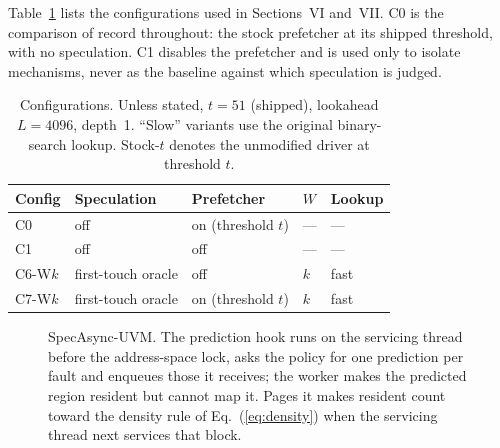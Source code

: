 Table~\ref{tab:configs} lists the configurations used in Sections~VI
and~VII. C0 is the comparison of record throughout: the stock prefetcher at
its shipped threshold, with no speculation. C1 disables the prefetcher and is
used only to isolate mechanisms, never as the baseline against which
speculation is judged.

\begin{table}[t]
\centering
\footnotesize
\setlength{\tabcolsep}{3.5pt}
\begin{tabular}{@{}l l l l l@{}}
\toprule
\textbf{Config} & \textbf{Speculation} & \textbf{Prefetcher} & $W$ & \textbf{Lookup} \\
\midrule
C0        & off                      & on (threshold $t$)  & --- & --- \\
C1        & off                      & off                 & --- & --- \\
C6-W$k$   & first-touch oracle       & off                 & $k$ & fast \\
C7-W$k$   & first-touch oracle       & on (threshold $t$)  & $k$ & fast \\
\bottomrule
\end{tabular}
\caption{Configurations. Unless stated, $t = 51$ (shipped), lookahead
$L = 4096$, depth~1. ``Slow'' variants use the original binary-search lookup.
Stock-$t$ denotes the unmodified driver at threshold $t$.}
\label{tab:configs}
\end{table}

\begin{figure}[t]
\centering

\caption{SpecAsync-UVM. The prediction hook runs on the servicing thread before
the address-space lock, asks the policy for one prediction per fault and
enqueues those it receives; the worker makes
the predicted region resident but cannot map it. Pages it makes resident count
toward the density rule of Eq.~(\ref{eq:density}) when the servicing thread
next services that block.}
\label{fig:design}
\end{figure}
